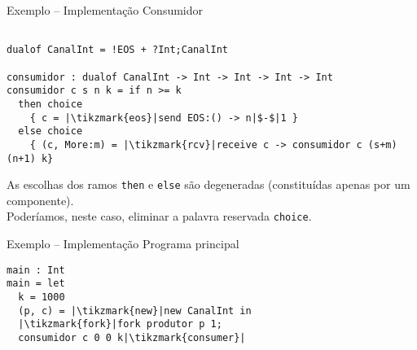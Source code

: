 \begin{frame}[fragile]{Exemplo -- Implementação  \hfill \color{mLightBrown}Consumidor}
  \begin{lstlisting}[xleftmargin=-.04\textwidth]

dualof CanalInt = !EOS + ?Int;CanalInt
    
consumidor : dualof CanalInt -> Int -> Int -> Int -> Int
consumidor c s n k = if n >= k
  then choice
    { c = |\tikzmark{eos}|send EOS:() -> n|$-$|1 }
  else choice
    { (c, More:m) = |\tikzmark{rcv}|receive c -> consumidor c (s+m) (n+1) k}
\end{lstlisting}


 
\begin{tcolorbox}
  As escolhas dos ramos \lstinline|then| e \lstinline|else| são degeneradas (constituídas apenas por um componente).\\
  Poderíamos, neste caso, eliminar a palavra reservada \lstinline|choice|.
\end{tcolorbox}

\end{frame}

\begin{frame}[fragile]{Exemplo -- Implementação  \hfill \color{mLightBrown}Programa principal}
  \begin{lstlisting}[xleftmargin=.2\textwidth, xrightmargin=.15\textwidth]
main : Int
main = let
  k = 1000
  (p, c) = |\tikzmark{new}|new CanalInt in
  |\tikzmark{fork}|fork produtor p 1;
  consumidor c 0 0 k|\tikzmark{consumer}|
\end{lstlisting}



\end{frame}


 

